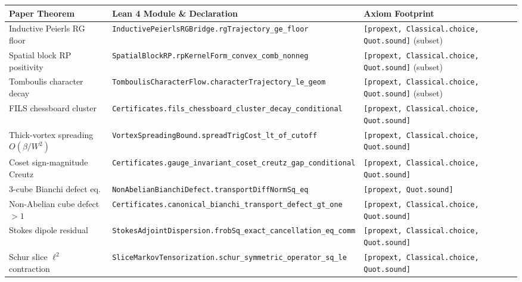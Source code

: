 \documentclass[11pt,a4paper]{article}
\begin{document}
\begin{table}[ht]
\centering
\scriptsize
\begin{tabular}{@{}p{4.3cm}p{6.6cm}p{3.4cm}@{}}
\toprule
Paper Theorem & Lean 4 Module \& Declaration & Axiom Footprint \\
\midrule
Inductive Peierls RG floor & \texttt{InductivePeierlsRGBridge.}\newline\texttt{rgTrajectory\_ge\_floor} & \texttt{[propext, Classical.choice,} \texttt{Quot.sound]} (subset) \\
Spatial block RP positivity & \texttt{SpatialBlockRP.}\newline\texttt{rpKernelForm\_convex\_comb\_nonneg} & \texttt{[propext, Classical.choice,} \texttt{Quot.sound]} (subset) \\
Tomboulis character decay & \texttt{TomboulisCharacterFlow.}\newline\texttt{characterTrajectory\_le\_geom} & \texttt{[propext, Classical.choice,} \texttt{Quot.sound]} (subset) \\
FILS chessboard cluster & \texttt{Certificates.}\newline\texttt{fils\_chessboard\_cluster\_decay\_conditional} & \texttt{[propext, Classical.choice,} \texttt{Quot.sound]} \\
Thick-vortex spreading $O(\beta/W^2)$ & \texttt{VortexSpreadingBound.}\newline\texttt{spreadTrigCost\_lt\_of\_cutoff} & \texttt{[propext, Classical.choice,} \texttt{Quot.sound]} \\
Coset sign-magnitude Creutz & \texttt{Certificates.}\newline\texttt{gauge\_invariant\_coset\_creutz\_gap\_conditional} & \texttt{[propext, Classical.choice,} \texttt{Quot.sound]} \\
3-cube Bianchi defect eq. & \texttt{NonAbelianBianchiDefect.}\newline\texttt{transportDiffNormSq\_eq} & \texttt{[propext, Quot.sound]} \\
Non-Abelian cube defect $> 1$ & \texttt{Certificates.}\newline\texttt{canonical\_bianchi\_transport\_defect\_gt\_one} & \texttt{[propext, Classical.choice,} \texttt{Quot.sound]} \\
Stokes dipole residual & \texttt{StokesAdjointDispersion.}\newline\texttt{frobSq\_exact\_cancellation\_eq\_comm} & \texttt{[propext, Classical.choice,} \texttt{Quot.sound]} \\
Schur slice $\ell^2$ contraction & \texttt{SliceMarkovTensorization.}\newline\texttt{schur\_symmetric\_operator\_sq\_le} & \texttt{[propext, Classical.choice,} \texttt{Quot.sound]} \\

\end{tabular}
\end{table}
\end{document}
